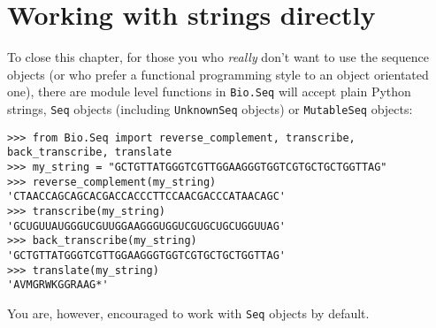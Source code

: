 \section{Working with strings directly}
\label{sec:seq-module-functions}
To close this chapter, for those you who \emph{really} don't want to use the sequence
objects (or who prefer a functional programming style to an object orientated one),
there are module level functions in \verb|Bio.Seq| will accept plain Python strings,
\verb|Seq| objects (including \verb|UnknownSeq| objects) or \verb|MutableSeq| objects:

\begin{verbatim}
>>> from Bio.Seq import reverse_complement, transcribe, back_transcribe, translate
>>> my_string = "GCTGTTATGGGTCGTTGGAAGGGTGGTCGTGCTGCTGGTTAG"
>>> reverse_complement(my_string)
'CTAACCAGCAGCACGACCACCCTTCCAACGACCCATAACAGC'
>>> transcribe(my_string)
'GCUGUUAUGGGUCGUUGGAAGGGUGGUCGUGCUGCUGGUUAG'
>>> back_transcribe(my_string)
'GCTGTTATGGGTCGTTGGAAGGGTGGTCGTGCTGCTGGTTAG'
>>> translate(my_string)
'AVMGRWKGGRAAG*'
\end{verbatim}

\noindent You are, however, encouraged to work with \verb|Seq| objects by default.
